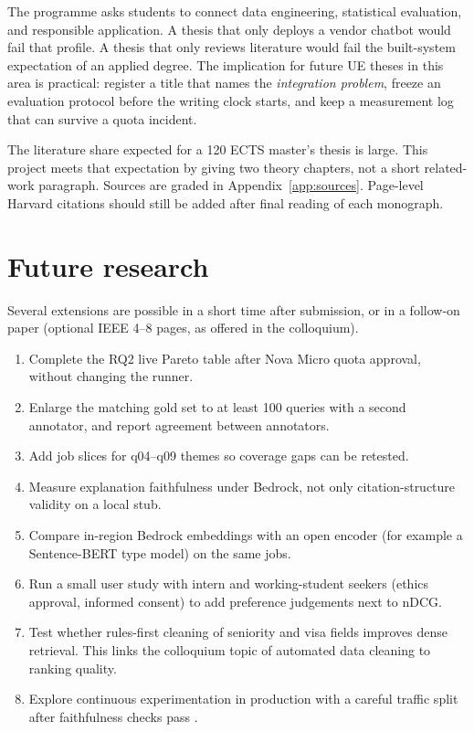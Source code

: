 The programme asks students to connect data engineering, statistical evaluation, and responsible application. A thesis that only deploys a vendor chatbot would fail that profile. A thesis that only reviews literature would fail the built-system expectation of an applied degree. The implication for future UE theses in this area is practical: register a title that names the \emph{integration problem}, freeze an evaluation protocol before the writing clock starts, and keep a measurement log that can survive a quota incident.

The literature share expected for a 120 ECTS master's thesis is large. This project meets that expectation by giving two theory chapters, not a short related-work paragraph. Sources are graded in Appendix~\ref{app:sources}. Page-level Harvard citations should still be added after final reading of each monograph.

\section{Future research}
\label{sec:future}

Several extensions are possible in a short time after submission, or in a follow-on paper (optional IEEE 4--8 pages, as offered in the colloquium).

\begin{enumerate}
  \item Complete the RQ2 live Pareto table after Nova Micro quota approval, without changing the runner.
  \item Enlarge the matching gold set to at least 100 queries with a second annotator, and report agreement between annotators.
  \item Add job slices for q04--q09 themes so coverage gaps can be retested.
  \item Measure explanation faithfulness under Bedrock, not only citation-structure validity on a local stub.
  \item Compare in-region Bedrock embeddings with an open encoder (for example a Sentence-BERT type model) on the same jobs.
  \item Run a small user study with intern and working-student seekers (ethics approval, informed consent) to add preference judgements next to nDCG.
  \item Test whether rules-first cleaning of seniority and visa fields improves dense retrieval. This links the colloquium topic of automated data cleaning to ranking quality.
  \item Explore continuous experimentation in production with a careful traffic split after faithfulness checks pass .
\end{enumerate}

